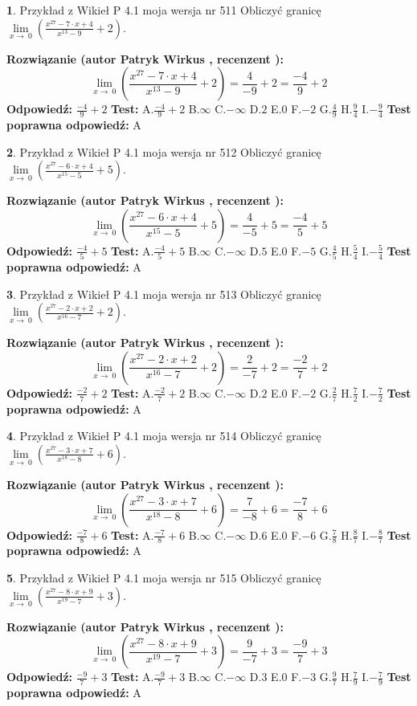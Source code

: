 \documentclass[12pt, a4paper]{article}
\theoremstyle{definition} %
\newtheorem{zad}{}
\newcommand{\zadStart}[1]{\begin{zad}#1\newline}
\newcommand{\zadStop}{\end{zad}}
\newcommand{\rozwStart}[2]{\noindent \textbf{Rozwiązanie (autor #1 , recenzent #2): }\newline}
\newcommand{\rozwStop}{\newline}
\newcommand{\odpStart}{\noindent \textbf{Odpowiedź:}\newline}
\newcommand{\odpStop}{\newline}
\newcommand{\testStart}{\noindent \textbf{Test:}\newline}
\newcommand{\testStop}{\newline}
\newcommand{\kluczStart}{\noindent \textbf{Test poprawna odpowiedź:}\newline}
\newcommand{\kluczStop}{\newline}
\begin{document}
\zadStart{Przykład z Wikieł P 4.1 moja wersja nr 511}
Obliczyć granicę $\lim\limits_{x\to\ 0}(\frac{x^{27}-7 \cdot x +4}{x^{13}-9}+2)$.
\zadStop
\rozwStart{Patryk Wirkus}{}
$$\lim\limits_{x\to\ 0}(\frac{x^{27}-7 \cdot x +4}{x^{13}-9}+2)=\frac{4}{-9}+2=\frac{-4}{9}+2$$
\rozwStop
\odpStart
$\frac{-4}{9}+2$
\odpStop
\testStart
A.$\frac{-4}{9}+2$
B.$\infty$
C.$-\infty$
D.$2$
E.$0$
F.$-2$
G.$\frac{4}{9}$
H.$\frac{9}{4}$
I.$-\frac{9}{4}$
\testStop
\kluczStart
A
\kluczStop



\zadStart{Przykład z Wikieł P 4.1 moja wersja nr 512}
Obliczyć granicę $\lim\limits_{x\to\ 0}(\frac{x^{27}-6 \cdot x +4}{x^{15}-5}+5)$.
\zadStop
\rozwStart{Patryk Wirkus}{}
$$\lim\limits_{x\to\ 0}(\frac{x^{27}-6 \cdot x +4}{x^{15}-5}+5)=\frac{4}{-5}+5=\frac{-4}{5}+5$$
\rozwStop
\odpStart
$\frac{-4}{5}+5$
\odpStop
\testStart
A.$\frac{-4}{5}+5$
B.$\infty$
C.$-\infty$
D.$5$
E.$0$
F.$-5$
G.$\frac{4}{5}$
H.$\frac{5}{4}$
I.$-\frac{5}{4}$
\testStop
\kluczStart
A
\kluczStop



\zadStart{Przykład z Wikieł P 4.1 moja wersja nr 513}
Obliczyć granicę $\lim\limits_{x\to\ 0}(\frac{x^{27}-2 \cdot x +2}{x^{16}-7}+2)$.
\zadStop
\rozwStart{Patryk Wirkus}{}
$$\lim\limits_{x\to\ 0}(\frac{x^{27}-2 \cdot x +2}{x^{16}-7}+2)=\frac{2}{-7}+2=\frac{-2}{7}+2$$
\rozwStop
\odpStart
$\frac{-2}{7}+2$
\odpStop
\testStart
A.$\frac{-2}{7}+2$
B.$\infty$
C.$-\infty$
D.$2$
E.$0$
F.$-2$
G.$\frac{2}{7}$
H.$\frac{7}{2}$
I.$-\frac{7}{2}$
\testStop
\kluczStart
A
\kluczStop



\zadStart{Przykład z Wikieł P 4.1 moja wersja nr 514}
Obliczyć granicę $\lim\limits_{x\to\ 0}(\frac{x^{27}-3 \cdot x +7}{x^{18}-8}+6)$.
\zadStop
\rozwStart{Patryk Wirkus}{}
$$\lim\limits_{x\to\ 0}(\frac{x^{27}-3 \cdot x +7}{x^{18}-8}+6)=\frac{7}{-8}+6=\frac{-7}{8}+6$$
\rozwStop
\odpStart
$\frac{-7}{8}+6$
\odpStop
\testStart
A.$\frac{-7}{8}+6$
B.$\infty$
C.$-\infty$
D.$6$
E.$0$
F.$-6$
G.$\frac{7}{8}$
H.$\frac{8}{7}$
I.$-\frac{8}{7}$
\testStop
\kluczStart
A
\kluczStop



\zadStart{Przykład z Wikieł P 4.1 moja wersja nr 515}
Obliczyć granicę $\lim\limits_{x\to\ 0}(\frac{x^{27}-8 \cdot x +9}{x^{19}-7}+3)$.
\zadStop
\rozwStart{Patryk Wirkus}{}
$$\lim\limits_{x\to\ 0}(\frac{x^{27}-8 \cdot x +9}{x^{19}-7}+3)=\frac{9}{-7}+3=\frac{-9}{7}+3$$
\rozwStop
\odpStart
$\frac{-9}{7}+3$
\odpStop
\testStart
A.$\frac{-9}{7}+3$
B.$\infty$
C.$-\infty$
D.$3$
E.$0$
F.$-3$
G.$\frac{9}{7}$
H.$\frac{7}{9}$
I.$-\frac{7}{9}$
\testStop
\kluczStart
A
\kluczStop
\end{document}
